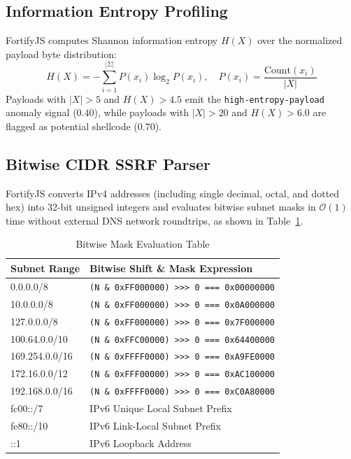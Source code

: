 \documentclass[conference]{IEEEtran}
\begin{document}
\subsection{Information Entropy Profiling}
FortifyJS computes Shannon information entropy $H(X)$ over the normalized payload byte distribution:
\begin{equation}
H(X) = -\sum_{i=1}^{|\Sigma|} P(x_i) \log_2 P(x_i), \quad P(x_i) = \frac{\text{Count}(x_i)}{|X|}
\end{equation}
Payloads with $|X| > 5$ and $H(X) > 4.5$ emit the \texttt{high-entropy-payload} anomaly signal ($0.40$), while payloads with $|X| > 20$ and $H(X) > 6.0$ are flagged as potential shellcode ($0.70$).

\subsection{Bitwise CIDR SSRF Parser}
FortifyJS converts IPv4 addresses (including single decimal, octal, and dotted hex) into 32-bit unsigned integers and evaluates bitwise subnet masks in $\mathcal{O}(1)$ time without external DNS network roundtrips, as shown in Table~\ref{tab:bitwise}.

\begin{table}[htbp]
\caption{Bitwise Mask Evaluation Table}
\label{tab:bitwise}
\centering\footnotesize
\begin{tabular}{ll}
\toprule
\textbf{Subnet Range} & \textbf{Bitwise Shift \& Mask Expression} \\
\midrule
0.0.0.0/8       & \texttt{(N \& 0xFF000000) >>> 0 === 0x00000000} \\
10.0.0.0/8      & \texttt{(N \& 0xFF000000) >>> 0 === 0x0A000000} \\
127.0.0.0/8     & \texttt{(N \& 0xFF000000) >>> 0 === 0x7F000000} \\
100.64.0.0/10   & \texttt{(N \& 0xFFC00000) >>> 0 === 0x64400000} \\
169.254.0.0/16  & \texttt{(N \& 0xFFFF0000) >>> 0 === 0xA9FE0000} \\
172.16.0.0/12   & \texttt{(N \& 0xFFF00000) >>> 0 === 0xAC100000} \\
192.168.0.0/16  & \texttt{(N \& 0xFFFF0000) >>> 0 === 0xC0A80000} \\
fc00::/7        & IPv6 Unique Local Subnet Prefix \\
fe80::/10       & IPv6 Link-Local Subnet Prefix \\
::1             & IPv6 Loopback Address \\
\bottomrule
\end{tabular}
\end{table}
\end{document}

